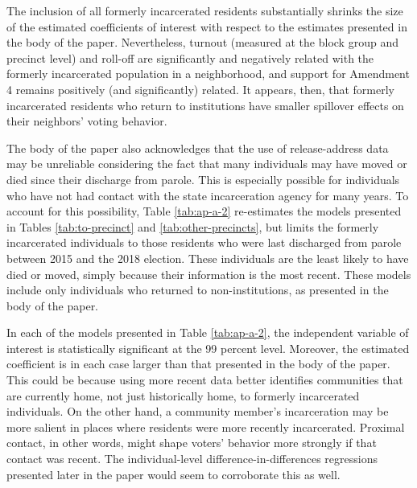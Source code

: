 \documentclass[
  12pt,
]{article}
\begin{document}
\begin{singlespace}


\end{singlespace}

The inclusion of all formerly incarcerated residents substantially shrinks the size of the estimated coefficients of interest with respect to the estimates presented in the body of the paper. Nevertheless, turnout (measured at the block group and precinct level) and roll-off are significantly and negatively related with the formerly incarcerated population in a neighborhood, and support for Amendment 4 remains positively (and significantly) related. It appears, then, that formerly incarcerated residents who return to institutions have smaller spillover effects on their neighbors' voting behavior.

The body of the paper also acknowledges that the use of release-address data may be unreliable considering the fact that many individuals may have moved or died since their discharge from parole. This is especially possible for individuals who have not had contact with the state incarceration agency for many years. To account for this possibility, Table \ref{tab:ap-a-2} re-estimates the models presented in Tables \ref{tab:to-precinct} and \ref{tab:other-precincts}, but limits the formerly incarcerated individuals to those residents who were last discharged from parole between 2015 and the 2018 election. These individuals are the least likely to have died or moved, simply because their information is the most recent. These models include only individuals who returned to non-institutions, as presented in the body of the paper.

\begin{singlespace}


\end{singlespace}

In each of the models presented in Table \ref{tab:ap-a-2}, the independent variable of interest is statistically significant at the 99 percent level. Moreover, the estimated coefficient is in each case larger than that presented in the body of the paper. This could be because using more recent data better identifies communities that are currently home, not just historically home, to formerly incarcerated individuals. On the other hand, a community member's incarceration may be more salient in places where residents were more recently incarcerated. Proximal contact, in other words, might shape voters' behavior more strongly if that contact was recent. The individual-level difference-in-differences regressions presented later in the paper would seem to corroborate this as well.
\end{document}
